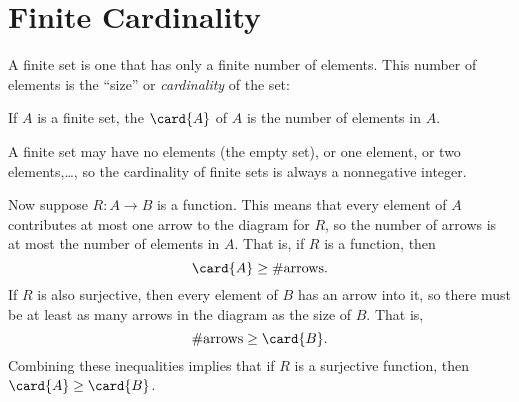 \iffalse
It gets interesting when we write composite expressions mixing images,
inverse images and set operations.  For example, $T(\inv{T}(D))$ is
the set of Spring '09 subjects that have an instructor in charge who
also is in in charge of an introductory subject.  So $T(\inv{T}(D)) -
D$ are the advanced subjects with someone in-charge who is also
in-charge of an introductory subject.  Similarly, $\inv{T}(D) \intersect
\inv{T}(N-D)$ is the set of faculty in charge of both an introductory \emph{and}
an advanced subject in Spring '09.
\fi

\begin{problems}
\practiceproblems
{}

\classproblems
{}

\homeworkproblems

\examproblems
{}
\end{problems}


\section{Finite Cardinality}\label{mappingrule_sec}

A finite set is one that has only a finite number of elements.  This
number of elements is the ``size'' or \emph{cardinality} of the set:
\begin{definition}\label{fin_card_def}
If $A$ is a finite set, the  $\card{A}$ of $A$ is
the number of elements in $A$.
\end{definition}
A finite set may have no elements (the empty set), or one element, or
two elements,\dots, so the cardinality of finite sets is always a
nonnegative integer.

Now suppose $R:A \to B$ is a function.  This means that every element
of $A$ contributes at most one arrow to the diagram for $R$, so the
number of arrows is at most the number of elements in $A$.  That is,
if $R$ is a function, then
\[
\card{A} \geq \#\text{arrows}.
\]
If $R$ is also surjective, then every element of $B$ has an arrow into
it, so there must be at least as many arrows in the diagram as the
size of $B$.  That is,
\[
\#\text{arrows} \geq \card{B}.
\]
Combining these inequalities implies that if $R$ is a surjective
function, then $\card{A} \geq \card{B}$.

